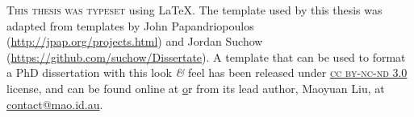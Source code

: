 
\clearpage
\par\vbox{}\null\vfill\nopagebreak

\small
\noindent
\parbox{105mm}{\textsc{This thesis was typeset} using \LaTeX. The template used by this thesis was adapted from templates by John \mbox{Papandriopoulos} (\url{http://jpap.org/projects.html}) and Jordan Suchow (\url{https://github.com/suchow/Dissertate}). A template that can be used to format a PhD dissertation with this look \textit{\&} feel has been released under \href{http://creativecommons.org/licenses/by-nc-nd/3.0/}{\textsc{cc by-nc-nd 3.0}} license, and can be found online at \href{https://github.com/XXXX} or from its lead author, Maoyuan Liu, at \mbox{\href{mailto:contact@mao.id.au}{contact@mao.id.au}}.}
